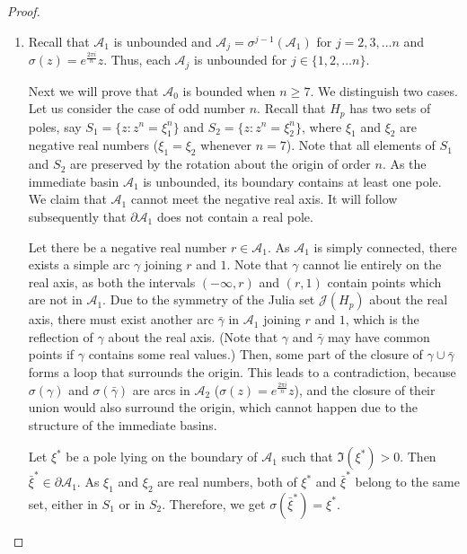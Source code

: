 \documentclass[12pt]{article}
\begin{document}
\begin{proof}
\begin{enumerate}
Therefore, for any $\sigma \in \Sigma H_{p},$ $\sigma (\mathcal{A}_{1})$ does
not map to $U$.
Hence $\sigma\left(\mathcal{A}_{1}\right)$ is mapped to $\mathcal{A}_{i}$, for some $i=1,2, \dots, n$.
This asserts that $\Sigma H_{p}=\left\{z \mapsto \lambda z: \lambda^{n}=1\right\}=\Sigma p.$
\par
\item %
Recall that $\mathcal{A}_1$ is unbounded and $\mathcal{A}_{j}=\sigma^{j-1}(\mathcal{A}_1)$ for $j=2,3,\dots n$ and $\sigma(z)=e^{\frac{2\pi i}{n}}z$. Thus,  each $\mathcal{A}_{j}$ is unbounded for $j\in\{1,2,\dots n\}$.
\par 
Next we will prove that $\mathcal{A}_0$ is bounded when $n\geq7$.
We distinguish two cases. Let us consider the case of odd number $n$.
Recall that $H_p$ has two sets of poles, say $S_1=\{z:z^n=\xi_1^n\}$ and $S_2=\{z:z^n=\xi_2^n\}$, where $\xi_1$ and $\xi_2$ are negative real numbers ($\xi_1=\xi_2$ whenever $n=7$). Note that all elements of $S_1$ and $S_2$ are preserved by the rotation about the origin of order $n$. As the immediate basin $\mathcal{A}_1$ is unbounded, its boundary contains at least one pole. We claim that $\mathcal{A}_1$ cannot meet the
negative real axis. It will follow subsequently that $\partial \mathcal{A}_1$ does not contain a real pole.
\par
Let there be a negative real number $r \in \mathcal{A}_1$. As $\mathcal{A}_1$ is simply connected, there exists a simple arc $\gamma$ joining $r$ and $1$. Note that $\gamma$ cannot lie entirely on the real axis, as both the intervals $(-\infty, r)$ and $(r, 1)$ contain points which are not in $\mathcal{A}_1$. Due to the symmetry of the Julia set $\mathcal{J}(H_p)$ about the real axis, there must exist another arc $\bar{\gamma}$ in $\mathcal{A}_1$ joining $r$ and $1$, which is the reflection of $\gamma$ about the real axis. (Note that $\gamma$ and $\bar{\gamma}$ may have common points if $\gamma$ contains some real values.) Then, some part of the closure of $\gamma \cup \bar{\gamma}$ forms a loop that surrounds the origin. This leads to a contradiction, because $\sigma(\gamma)$ and $\sigma(\bar{\gamma})$ are arcs in $\mathcal{A}_2$ ($ \sigma (z)=e^{\frac{2\pi i}{n}}z $), and the closure of their union would also surround the origin, which cannot happen due to the structure of the immediate basins.
\par
Let $\xi^*$ be a pole lying on the boundary of $\mathcal{A}_1$ such that $\Im(\xi^*)>0$. Then $\bar{\xi}^*\in \partial \mathcal{A}_1$. As $\xi_1$ and $\xi_2$ are real numbers, both of $\xi^*$ and $\bar{\xi}^*$ belong to the same set, either in $S_1$ or in $S_2$. Therefore, we get $\sigma(\bar{\xi}^*)=\xi^*$.

\end{enumerate}
\end{proof}
\end{document}
